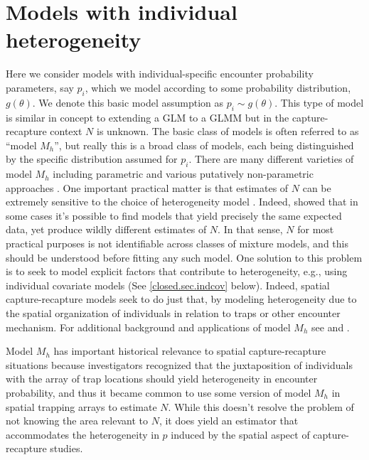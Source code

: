 \section{ Models with individual heterogeneity}
\label{closed.sec.modelmh}

Here we consider models with individual-specific encounter probability
parameters, say $p_{i}$, which we model according to some probability
distribution, $g(\theta)$. We denote this basic model assumption as
$p_{i} \sim g(\theta)$. This type of model is similar in concept to
extending a GLM to a GLMM but in the capture-recapture context $N$ is
unknown.  The basic class of models is often referred to as ``model
$M_h$'', but really this is a broad class of models, each being
distinguished by the specific distribution assumed for $p_{i}$.  There
are many different varieties of model $M_{h}$ including parametric and
various putatively non-parametric approaches
\citep{burnham_overton:1978, norris_pollock:1996, pledger:2000}. One
important practical matter is that estimates of $N$ can be extremely
sensitive to the choice of heterogeneity model
\citep{fienberg_etal:1999, dorazio_royle:2003, link:2003}. Indeed,
\citet{link:2003} showed that in some cases it's possible to find
models that yield precisely the same expected data, yet produce wildly
different estimates of $N$. In that sense, $N$ for most practical
purposes is not identifiable across classes of mixture models, and
this should be understood before fitting any such model. One solution
to this problem is to seek to model explicit factors that contribute
to heterogeneity, e.g., using individual covariate models (See
\ref{closed.sec.indcov} below). Indeed, spatial capture-recapture
models seek to do just that, by modeling heterogeneity due to the
spatial organization of individuals in relation to traps or other
encounter mechanism.  For additional background and applications of
model $M_{h}$ see \citet[][Chapt. 6]{royle_dorazio:2008} and
\citet[][Chapt. 6]{kery_schaub:2011}.

Model $M_{h}$ has important historical relevance to spatial
capture-recapture situations \citep{karanth:1995} because
investigators recognized that the juxtaposition of individuals with
the array of trap locations should yield heterogeneity in encounter
probability, and thus it became common to use some version of model $M_h$
in spatial trapping arrays to estimate $N$.  While this doesn't
resolve the problem of not knowing the area relevant to $N$, it does
yield an estimator that accommodates the heterogeneity in $p$ induced
by the spatial aspect of capture-recapture studies.

